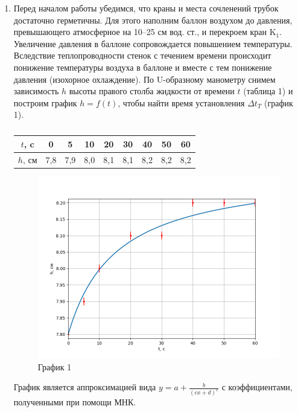 \documentclass[a4paper,12pt]{article} %
\begin{document}
\begin{enumerate}
	\item Перед началом работы убедимся, что краны и места сочленений трубок достаточно герметичны. Для этого наполним баллон воздухом до давления, превышающего атмосферное на 10–25 см вод. ст., и перекроем кран $\text{K}_{1}$. Увеличение давления в баллоне сопровождается повышением температуры. Вследствие теплопроводности стенок с течением времени происходит понижение температуры воздуха в баллоне и вместе с тем понижение давления (изохорное охлаждение). По U-образному манометру снимем зависимость $h$ высоты правого столба жидкости от времени $t$ (таблица 1) и построим график $h = f(t)$, чтобы найти время установления $\Delta t_{T}$ (график 1).
	
	
	\begin{table}[h!]
		\centering
		\begin{tabular}{|c|c|c|c|c|c|c|c|c|}
			\hline
			$t$, c  & 0   & 5   & 10  & 20  & 30  & 40  & 50  & 60  \\ \hline
			$h$, см & 7,8 & 7,9 & 8,0 & 8,1 & 8,1 & 8,2 & 8,2 & 8,2 \\ \hline
		\end{tabular}
	\caption{}
	\end{table}

	\begin{figure}[h!]
		\centering
		\includegraphics[scale = 0.8]{Pictures/h(t).png}
		\caption*{График 1}
	\end{figure}
\newpage
График является аппроксимацией вида $y = a + \frac{b}{(cx+d)^{e}}$ с коэффициентами, полученными при помощи МНК.



\end{enumerate}
\end{document}
